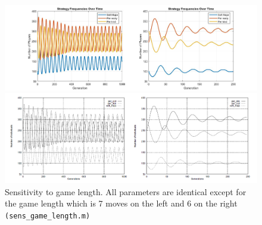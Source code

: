 \begin{figure}[ht!]
	\centering
	\begin{minipage}{1\textwidth}
		\includegraphics[width=1\linewidth]{fit_plots_theoretical/sensitivity_to_game_length}
		
		
	\end{minipage}
	\begin{minipage}{1\textwidth}
		\includegraphics[width=1\linewidth]{sens_gamelength}
	\end{minipage}
	\caption{Sensitivity to game length. All parameters are identical except for the game
	length which is 7 moves on the left and 6 on the right \texttt{(sens\_game\_length.m)}}
\end{figure}


